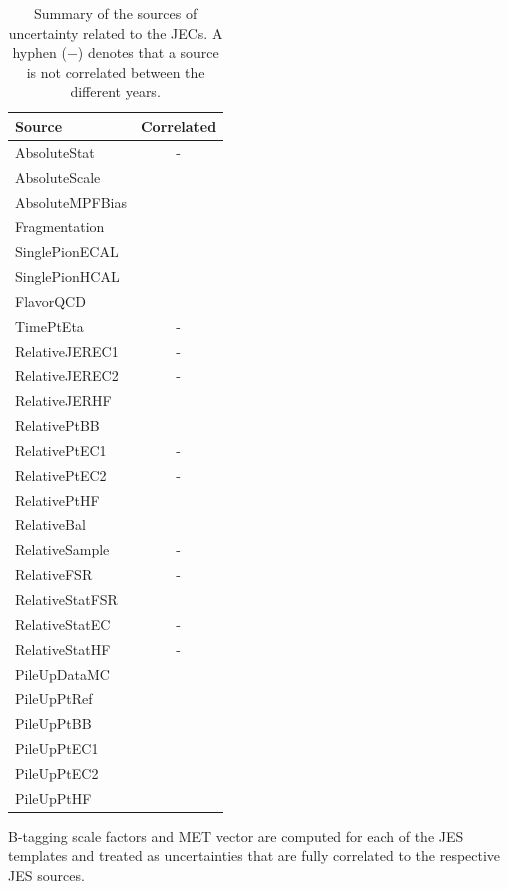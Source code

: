 \begin{table}[!hbtp]
\sffamily
\begin{center}
\caption{
Summary of the sources of uncertainty related to the JECs.
A hyphen ($-$) denotes that a source is not correlated between the different years.
}
\label{tab:jec}
\begin{tabular}{|l|c|}
\hline
Source & Correlated\\
\hline
AbsoluteStat			& -			 \\
AbsoluteScale			& \checkmark			 \\
AbsoluteMPFBias			& \checkmark 		 	 \\
Fragmentation			& \checkmark			 \\
SinglePionECAL			& \checkmark			 \\
SinglePionHCAL			& \checkmark			 \\
FlavorQCD				& \checkmark			 \\
TimePtEta				& -			 \\
RelativeJEREC1			& -			 \\
RelativeJEREC2			& -			 \\
RelativeJERHF			& \checkmark			 \\
RelativePtBB			& \checkmark			 \\
RelativePtEC1			& -			 \\
RelativePtEC2			& -			 \\
RelativePtHF			& \checkmark			 \\
RelativeBal				& \checkmark			 \\
RelativeSample			& -			 \\
RelativeFSR				& -			 \\
RelativeStatFSR			& \checkmark			 \\
RelativeStatEC			& -			 \\
RelativeStatHF			& -			 \\
PileUpDataMC			& \checkmark			 \\
PileUpPtRef				& \checkmark			 \\
PileUpPtBB				& \checkmark			 \\
PileUpPtEC1				& \checkmark			 \\
PileUpPtEC2				& \checkmark			 \\
PileUpPtHF				& \checkmark			 \\
\hline
\end{tabular}
\end{center}
\end{table}

B-tagging scale factors and MET vector are computed for each of the JES templates and treated as uncertainties that are fully correlated to the respective JES sources. 

